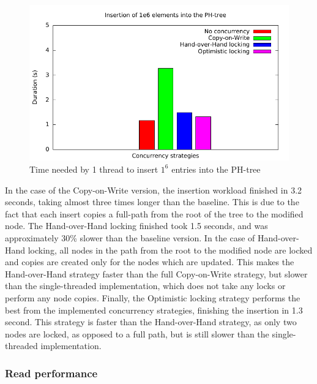 \documentclass[11pt,a4paper]{globis-book}
\begin{document}
\begin{figure}[h]
    \centering 
    \includegraphics[scale=1]{images/plots/concurrent-comp}
    \caption{Time needed by 1 thread to insert $1^6$ entries into the PH-tree}
    \label{fig:concurrent-comp}
\end{figure}

In the case of the Copy-on-Write version, the insertion workload finished in 3.2 seconds, taking almost three times longer than the baseline. This is due to the fact that each insert copies a full-path from the root of the tree to the modified node. The Hand-over-Hand locking finished took 1.5 seconds, and was approximately 30\% slower than the baseline version. In the case of Hand-over-Hand locking, all nodes in the path from the root to the modified node are locked and copies are created only for the nodes which are updated. This makes the Hand-over-Hand strategy faster than the full Copy-on-Write strategy, but slower than the single-threaded implementation, which does not take any locks or perform any node copies. Finally, the Optimistic locking strategy performs the best from the implemented concurrency strategies, finishing the insertion in 1.3 second. This strategy is faster than the Hand-over-Hand strategy, as only two nodes are locked, as opposed to a full path, but is still slower than the single-threaded implementation.

\subsubsection{Read performance}
\end{document}
